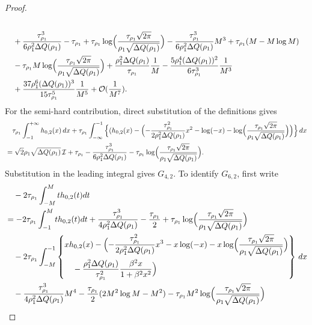 \documentclass[a4paper]{article}
\numberwithin{equation}{section}
\begin{document}
\begin{proof}
\begin{align*}
\\
&\quad
+
\frac{\tau_{\rho_1}^3}{6\rho_1^2\Delta Q(\rho_1)}-\tau_{\rho_1}+\tau_{\rho_1}\log\Bigl(\frac{\tau_{\rho_1}\sqrt{2\pi}}{\rho_1\sqrt{\Delta Q(\rho_1)}}\Bigr)
-
\frac{\tau_{\rho_1}^3}{6\rho_1^2\Delta Q(\rho_1)}M^3
+\tau_{\rho_1}(M-M\log M)
\\
&\quad
-\tau_{\rho_1}M\log\Bigl(\frac{\tau_{\rho_1}\sqrt{2\pi}}{\rho_1\sqrt{\Delta Q(\rho_1)}}\Bigr)
+\frac{\rho_1^2\Delta Q(\rho_1)}{\tau_{\rho_1}}\frac{1}{M}
-\frac{5\rho_1^4(\Delta Q(\rho_1))^2}{6\tau_{\rho_1}^3}\frac{1}{M^3}
\\
&\quad+\frac{37\rho_1^6(\Delta Q(\rho_1))^3}{15\tau_{\rho_1}^5}\frac{1}{M^5}
+\mathcal{O}(\frac{1}{M^7}). 
\end{align*}
For the semi-hard contribution, direct substitution of the definitions gives
\begin{align*}
&\quad \tau_{\rho_1}\int_{-1}^{+\infty} h_{0,2}(x) \,dx
+
\tau_{\rho_1}\int_{-\infty}^{-1}\Big\{( h_{0,2}(x)-\Bigl(-\frac{\tau_{\rho_1}^2}{2\rho_1^2\Delta Q(\rho_1)}x^2-\log(-x)-\log\Bigl(\frac{\tau_{\rho_1}\sqrt{2\pi}}{\rho_1\sqrt{\Delta Q(\rho_1)}}\Bigr)\Bigr) \Bigr\}\,dx
\\
&=
\sqrt{2}\rho_1\sqrt{\Delta Q(\rho_1)}\,\mathcal{I}
+\tau_{\rho_1}
-\frac{\tau_{\rho_1}^3}{6\rho_1^2\Delta Q(\rho_1)}
-\tau_{\rho_1}\log\Bigl(\frac{\tau_{\rho_1}\sqrt{2\pi}}{\rho_1\sqrt{\Delta Q(\rho_1)}}\Bigr). 
\end{align*}
Substitution in the leading integral gives $G_{4,2}$. To identify $G_{6,2}$, first write
\begin{align*}
&\quad-2 \tau_{\rho_1}\int_{-M}^{M} th_{0,2}(t) dt
\\
&=
-2 \tau_{\rho_1}\int_{-1}^{M} th_{0,2}(t) dt
+\frac{\tau_{\rho_1}^3}{4\rho_1^2\Delta Q(\rho_1)}
-\frac{\tau_{\rho_1}}{2}
+\tau_{\rho_1}\log\Bigl(\frac{\tau_{\rho_1}\sqrt{2\pi}}{\rho_1\sqrt{\Delta Q(\rho_1)}}\Bigr)
\\
&\quad
-2\tau_{\rho_1}
\int_{-M}^{-1}\left\{\begin{aligned}&xh_{0,2}(x) 
-\Bigl( 
-\frac{\tau_{\rho_1}^2}{2\rho_1^2\Delta Q(\rho_1)}x^3-x\log(-x)-x\log\Bigl(\frac{\tau_{\rho_1}\sqrt{2\pi}}{\rho_1\sqrt{\Delta Q(\rho_1)}}\Bigr)
\\
&\quad-\frac{\rho_1^2\Delta Q(\rho_1)}{\tau_{\rho_1}^2}\frac{\beta^2x}{1+\beta^2x^2}
\Bigr)\end{aligned}
\right\}\,dx
\\
&\quad
-\frac{\tau_{\rho_1}^3}{4\rho_1^2\Delta Q(\rho_1)}M^4
-\frac{\tau_{\rho_1}}{2}(2M^2\log M-M^2)
-\tau_{\rho_1}M^2\log\Bigl(\frac{\tau_{\rho_1}\sqrt{2\pi}}{\rho_1\sqrt{\Delta Q(\rho_1)}}\Bigr)

\end{align*}
\end{proof}
\end{document}
